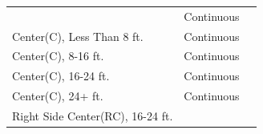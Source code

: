\documentclass[]{article}
\begin{document}
\begin{longtable}[]{@{}lll@{}}
\begin{minipage}[t]{0.32\columnwidth}
\end{minipage} & \begin{minipage}[t]{0.12\columnwidth}\raggedright
Continuous\strut
\end{minipage} & \begin{minipage}[t]{0.47\columnwidth}\raggedright
\strut
\end{minipage}\tabularnewline
\begin{minipage}[t]{0.32\columnwidth}\raggedright
Center(C), Less Than 8 ft.\strut
\end{minipage} & \begin{minipage}[t]{0.12\columnwidth}\raggedright
Continuous\strut
\end{minipage} & \begin{minipage}[t]{0.47\columnwidth}\raggedright
\strut
\end{minipage}\tabularnewline
\begin{minipage}[t]{0.32\columnwidth}\raggedright
Center(C), 8-16 ft.\strut
\end{minipage} & \begin{minipage}[t]{0.12\columnwidth}\raggedright
Continuous\strut
\end{minipage} & \begin{minipage}[t]{0.47\columnwidth}\raggedright
\strut
\end{minipage}\tabularnewline
\begin{minipage}[t]{0.32\columnwidth}\raggedright
Center(C), 16-24 ft.\strut
\end{minipage} & \begin{minipage}[t]{0.12\columnwidth}\raggedright
Continuous\strut
\end{minipage} & \begin{minipage}[t]{0.47\columnwidth}\raggedright
\strut
\end{minipage}\tabularnewline
\begin{minipage}[t]{0.32\columnwidth}\raggedright
Center(C), 24+ ft.\strut
\end{minipage} & \begin{minipage}[t]{0.12\columnwidth}\raggedright
Continuous\strut
\end{minipage} & \begin{minipage}[t]{0.47\columnwidth}\raggedright
\strut
\end{minipage}\tabularnewline
\begin{minipage}[t]{0.32\columnwidth}\raggedright
Right Side Center(RC), 16-24 ft.\strut
\end{minipage} & \begin{minipage}[t]{0.12\columnwidth}\raggedright

\end{minipage}
\end{longtable}
\end{document}
